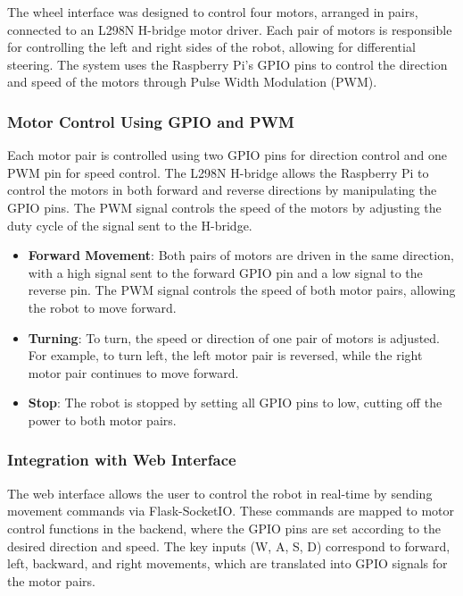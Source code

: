 The wheel interface was designed to control four motors, arranged in pairs, connected to an L298N H-bridge motor driver. Each pair of motors is responsible for controlling the left and right sides of the robot, allowing for differential steering. The system uses the Raspberry Pi's GPIO pins to control the direction and speed of the motors through Pulse Width Modulation (PWM).

\subsubsection{Motor Control Using GPIO and PWM}

Each motor pair is controlled using two GPIO pins for direction control and one PWM pin for speed control. The L298N H-bridge allows the Raspberry Pi to control the motors in both forward and reverse directions by manipulating the GPIO pins. The PWM signal controls the speed of the motors by adjusting the duty cycle of the signal sent to the H-bridge.

\begin{itemize}
	\item \textbf{Forward Movement}: Both pairs of motors are driven in the same direction, with a high signal sent to the forward GPIO pin and a low signal to the reverse pin. The PWM signal controls the speed of both motor pairs, allowing the robot to move forward.
	\item \textbf{Turning}: To turn, the speed or direction of one pair of motors is adjusted. For example, to turn left, the left motor pair is reversed, while the right motor pair continues to move forward.
	\item \textbf{Stop}: The robot is stopped by setting all GPIO pins to low, cutting off the power to both motor pairs.
\end{itemize}

\subsubsection{Integration with Web Interface}

The web interface allows the user to control the robot in real-time by sending movement commands via Flask-SocketIO. These commands are mapped to motor control functions in the backend, where the GPIO pins are set according to the desired direction and speed. The key inputs (W, A, S, D) correspond to forward, left, backward, and right movements, which are translated into GPIO signals for the motor pairs.

